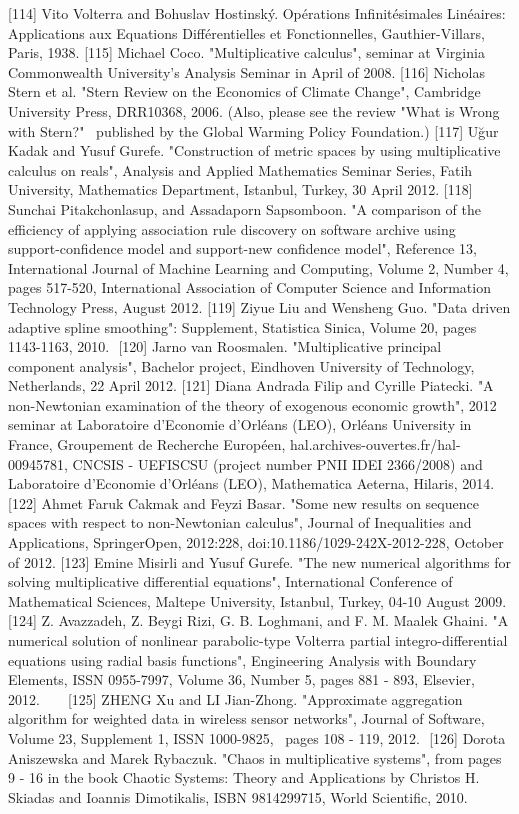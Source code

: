 \documentclass[12pt]{article}
\begin{document}
[114] Vito Volterra and Bohuslav Hostinský. Opérations Infinitésimales Linéaires: Applications aux Equations Différentielles et Fonctionnelles, Gauthier-Villars, Paris, 1938.
[115] Michael Coco. "Multiplicative calculus", seminar at Virginia Commonwealth University's Analysis Seminar in April of 2008. 
[116] Nicholas Stern et al. "Stern Review on the Economics of Climate Change", Cambridge University Press, DRR10368, 2006. (Also, please see the review "What is Wrong with Stern?"  published by the Global Warming Policy Foundation.) 
[117] Uğur Kadak and Yusuf Gurefe. "Construction of metric spaces by using multiplicative calculus on reals", Analysis and Applied Mathematics Seminar Series, Fatih University, Mathematics Department, Istanbul, Turkey, 30 April 2012.
[118] Sunchai Pitakchonlasup, and Assadaporn Sapsomboon. "A comparison of the efficiency of applying association rule discovery on software archive using support-confidence model and support-new confidence model", Reference 13, International Journal of Machine Learning and Computing, Volume 2, Number 4, pages 517-520, International Association of Computer Science and Information Technology Press, August 2012.
[119] Ziyue Liu and Wensheng Guo. "Data driven adaptive spline smoothing": Supplement, Statistica Sinica, Volume 20, pages 1143-1163, 2010.  [120] Jarno van Roosmalen. "Multiplicative principal component analysis", Bachelor project, Eindhoven University of Technology, Netherlands, 22 April 2012.
[121] Diana Andrada Filip and Cyrille Piatecki. "A non-Newtonian examination of the theory of exogenous economic growth", 2012 seminar at Laboratoire d’Economie d’Orléans (LEO), Orléans University in France, Groupement de Recherche Européen, hal.archives-ouvertes.fr/hal-00945781, CNCSIS - UEFISCSU (project number PNII IDEI 2366/2008) and Laboratoire d’Economie d’Orléans (LEO), Mathematica Aeterna, Hilaris, 2014. 
[122] Ahmet Faruk Cakmak and Feyzi Basar. "Some new results on sequence spaces with respect to non-Newtonian calculus", Journal of Inequalities and Applications, SpringerOpen, 2012:228, doi:10.1186/1029-242X-2012-228, October of 2012.
[123] Emine Misirli and Yusuf Gurefe. "The new numerical algorithms for solving multiplicative differential equations", International Conference of Mathematical Sciences, Maltepe University, Istanbul, Turkey, 04-10 August 2009.
[124] Z. Avazzadeh, Z. Beygi Rizi, G. B. Loghmani, and F. M. Maalek Ghaini. "A numerical solution of nonlinear parabolic-type Volterra partial integro-differential equations using radial basis functions", Engineering Analysis with Boundary Elements, ISSN 0955-7997, Volume 36, Number 5, pages 881 - 893, Elsevier, 2012.     [125] ZHENG Xu and LI Jian-Zhong. "Approximate aggregation algorithm for weighted data in wireless sensor networks", Journal of Software, Volume 23, Supplement 1, ISSN 1000-9825,  pages 108 - 119, 2012.  [126] Dorota Aniszewska and Marek Rybaczuk. "Chaos in multiplicative systems", from pages 9 - 16 in the book Chaotic Systems: Theory and Applications by Christos H. Skiadas and Ioannis Dimotikalis, ISBN 9814299715, World Scientific, 2010.
\end{document}
